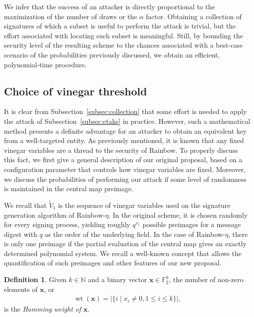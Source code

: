 \documentclass[12pt, a4paper, oneside]{memoir}
\DeclareMathOperator*{\wt}{wt}
\theoremstyle{definition}
\newtheorem{definition}[theorem]{Definition}
\begin{document}
We infer that the success of an attacker is directly proportional to the maximization of the number of draws or the $\alpha$ factor. Obtaining a collection of signatures of which a subset is useful to perform the attack is trivial, but the effort associated with locating such subset is meaningful. Still, by bounding the security level of the resulting scheme to the chances associated with a best-case scenario of the probabilities previously discussed, we obtain an efficient, polynomial-time procedure.

\subsection{Choice of vinegar threshold}\label{subsec:threshold}

It is clear from Subsection~\ref{subsec:collection} that some effort is needed to apply the attack of Subsection~\ref{subsec:etaks} in practice. However, such a mathematical method presents a definite advantage for an attacker to obtain an equivalent key from a well-targeted entity. As previously mentioned, it is known that any fixed vinegar variables are a thread to the security of Rainbow. To properly discuss this fact, we first give a general description of our original proposal, based on a configuration parameter that controls how vinegar variables are fixed. Moreover, we discuss the probabilities of performing our attack if some level of randomness is maintained in the central map preimage.

We recall that $\widetilde{V}_{1}$ is the sequence of vinegar variables used on the signature generation algorithm of Rainbow-$\eta$. In the original scheme, it is chosen randomly for every signing process, yielding roughly $q^{v_{1}}$ possible preimages for a message digest with $q$ as the order of the underlying field. In the case of Rainbow-$\eta$, there is only one preimage if the partial evaluation of the central map gives an exactly determined polynomial system. We recall a well-known concept that allows the quantification of such preimages and other features of our new proposal.

\begin{definition}
  Given $k \in \mathbb{N}$ and a binary vector $\mathbf{x} \in \mathbb{F}_{2}^{k}$, the number of non-zero elements of $\mathbf{x}$, or
  \begin{align}
    \wt(\mathbf{x}) = |\{ i \mid x_{i} \neq 0, 1 \leq i \leq k \}|,
  \end{align}
  is the \emph{Hamming weight of $\mathbf{x}$}.
\end{definition}
\end{document}
